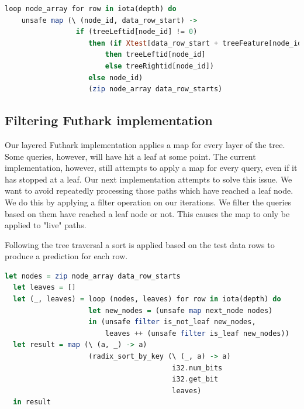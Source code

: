 \documentclass[a4paper]{article}
\begin{document}
\vspace{1ex}
\begin{lrbox}{\lstboxtwo}
\begin{minipage}{\textwidth}
\begin{lstlisting}[language=Haskell, breaklines]
loop node_array for row in iota(depth) do
    unsafe map (\ (node_id, data_row_start) ->
                 if (treeLeftid[node_id] != 0)
                    then (if Xtest[data_row_start + treeFeature[node_id]] <= treeThres_or_leaf[node_id]
                        then treeLeftid[node_id]
                        else treeRightid[node_id])
                    else node_id)
                    (zip node_array data_row_starts)
\end{lstlisting}
\end{minipage}
\end{lrbox}
\vspace{1ex}

\colorbox{lightgray}{\usebox\lstboxtwo}

\subsection{Filtering Futhark implementation}

Our layered Futhark implementation applies a map for every layer of the tree. Some queries, however, will have hit a leaf at some point. The current implementation, however, still attempts to apply a map for every query, even if it has stopped at a leaf. Our next implementation attempts to solve this issue.
We want to avoid repeatedly processing those paths which have reached a leaf node. We do this by applying a filter operation on our iterations. We filter the queries based on them have reached a leaf node or not. This causes the map to only be applied to "live" paths.

Following the tree traversal a sort is applied based on the test data rows to produce a prediction for each row.

\vspace{1ex}
\begin{lrbox}{\lstboxthree}
\begin{minipage}{\textwidth}
\begin{lstlisting}[language=Haskell, breaklines]
  let nodes = zip node_array data_row_starts
  let leaves = []
  let (_, leaves) = loop (nodes, leaves) for row in iota(depth) do
                    let new_nodes = (unsafe map next_node nodes)
                    in (unsafe filter is_not_leaf new_nodes,
                        leaves ++ (unsafe filter is_leaf new_nodes))
  let result = map (\ (a, _) -> a)
                    (radix_sort_by_key (\ (_, a) -> a)
                                        i32.num_bits
                                        i32.get_bit
                                        leaves)
  in result
\end{lstlisting}
\end{minipage}
\end{lrbox}
\vspace{1ex}
\end{document}
